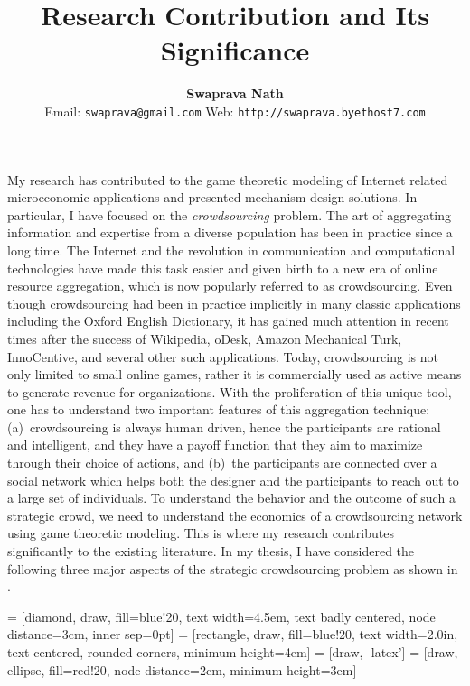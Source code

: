\documentclass[11pt,psfig,letter]{article}
\title{\vspace{-0.5in}\sc Research Contribution and Its Significance\vspace{-2mm}}
\author{{\bf Swaprava Nath} 
	\\ \small{Email: \texttt{swaprava@gmail.com} \hspace{1cm} Web: \texttt{http://swaprava.byethost7.com}}\vspace{-0.25mm}
}
\date{}
\begin{document}
\maketitle

\vspace{-0.25in}

\noindent
My research has contributed to the game theoretic modeling of Internet related microeconomic applications and presented mechanism design solutions. In particular, I have focused on the {\em crowdsourcing} problem. The art of aggregating information and expertise from a diverse population has been in practice since a long time.
The Internet and the revolution in communication and computational technologies have made this task easier and given birth to a new era of online resource aggregation, which is now popularly referred to as crowdsourcing. Even though crowdsourcing had been in practice implicitly in many classic applications including the Oxford English Dictionary, it has gained much attention in recent times after the success of Wikipedia, oDesk, Amazon Mechanical Turk, InnoCentive, and several other such applications. Today, crowdsourcing is not only limited to small online games, rather it is commercially used as active means to generate revenue for organizations.
With the proliferation of this unique tool, one has to understand two important features of this aggregation technique: (a)~crowdsourcing is always human driven, hence the participants are rational and intelligent, and they have a payoff function that they aim to maximize through their choice of actions, and (b)~the participants are connected over a social network which helps both the designer and the participants to reach out to a large set of individuals. To understand the behavior and the outcome of such a strategic crowd, we need to understand the economics of a crowdsourcing network using game theoretic modeling. This is where my research contributes significantly to the existing literature. In my thesis, I have considered the following three major aspects of the strategic crowdsourcing problem as shown in .

 = [diamond, draw, fill=blue!20, text width=4.5em, text badly centered, node distance=3cm, inner sep=0pt]
 = [rectangle, draw, fill=blue!20, text width=2.0in, text centered, rounded corners, minimum height=4em]
 = [draw, -latex']
 = [draw, ellipse, fill=red!20, node distance=2cm, minimum height=3em]
\end{document}
